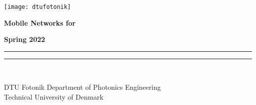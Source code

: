 \begin{titlepage}%
\noindent{}\texttt{[image: dtufotonik]}%

\noindent\parbox[t][5.8cm][c]{\textwidth}{\centering\bfseries{\Huge{}Mobile Networks for}\\}

\noindent\parbox[t][1.2cm][b]{\textwidth}{\hfill{}{\large\bfseries{}Spring 2022}}

\noindent\rule{\textwidth}{.5mm}

%

\begin{center}
%
\end{center}


\noindent\parbox[t][1cm][b]{\textwidth}{}

\noindent\rule{\textwidth}{.5mm}\\%
\begin{minipage}{\textwidth}\raggedleft
\vspace{2mm}DTU Fotonik Department of Photonics Engineering\\%
Technical University of Denmark
\end{minipage}
\end{titlepage}
